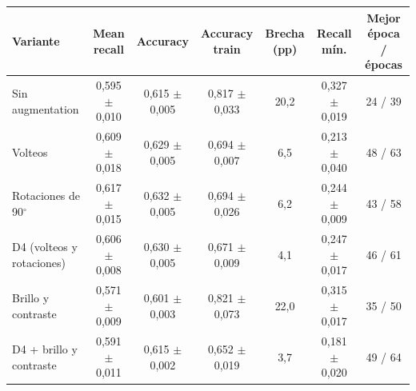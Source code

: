 \begin{tabular}{lcccccc}
\toprule
Variante & Mean recall & Accuracy & Accuracy train & Brecha (pp) & Recall mín. & Mejor época / épocas \\
\midrule
Sin augmentation & 0,595 $\pm$ 0,010 & 0,615 $\pm$ 0,005 & 0,817 $\pm$ 0,033 & 20,2 & 0,327 $\pm$ 0,019 & 24 / 39 \\
Volteos & 0,609 $\pm$ 0,018 & 0,629 $\pm$ 0,005 & 0,694 $\pm$ 0,007 & 6,5 & 0,213 $\pm$ 0,040 & 48 / 63 \\
Rotaciones de 90$^\circ$ & 0,617 $\pm$ 0,015 & 0,632 $\pm$ 0,005 & 0,694 $\pm$ 0,026 & 6,2 & 0,244 $\pm$ 0,009 & 43 / 58 \\
D4 (volteos y rotaciones) & 0,606 $\pm$ 0,008 & 0,630 $\pm$ 0,005 & 0,671 $\pm$ 0,009 & 4,1 & 0,247 $\pm$ 0,017 & 46 / 61 \\
Brillo y contraste & 0,571 $\pm$ 0,009 & 0,601 $\pm$ 0,003 & 0,821 $\pm$ 0,073 & 22,0 & 0,315 $\pm$ 0,017 & 35 / 50 \\
D4 + brillo y contraste & 0,591 $\pm$ 0,011 & 0,615 $\pm$ 0,002 & 0,652 $\pm$ 0,019 & 3,7 & 0,181 $\pm$ 0,020 & 49 / 64 \\
\bottomrule
\end{tabular}
